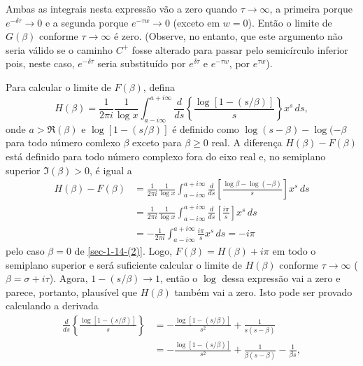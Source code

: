     Ambas as integrais nesta expressão vão a zero quando $\tau \to \infty$, a primeira porque $e^{-\delta \tau} \to 0$ e a segunda porque $e^{- \tau w} \to 0$ (exceto em $w = 0$). Então o limite de $G(\beta)$ conforme $\tau \to \infty$ é zero. (Observe, no entanto, que este argumento não seria válido se o caminho $C^{+}$ fosse alterado para passar pelo semicírculo inferior pois, neste caso, $e^{-\delta \tau}$ seria substituído por $e^{\delta \tau}$ e $e^{-\tau w}$, por $e^{\tau w}$).
    
    Para calcular o limite de $F(\beta)$, defina
    \begin{equation*}
        H(\beta) = \frac{1}{2 \pi i} \frac{1}{\log x} \int_{a - i\infty}^{a + i \infty} \frac{d}{ds} \left\{ \frac{\log [1 - (s/\beta)]}{s}\right\} x^s\, ds,
    \end{equation*}
    onde $a > \Re (\beta)$ e $\log [1 - (s/\beta)]$ é definido como $\log(s-\beta) - \log(-\beta$ para todo número comlexo $\beta$ exceto para $\beta \geq 0$ real. A diferença $H(\beta) - F(\beta)$ está definido para todo número complexo fora do eixo real e, no semiplano superior $\Im(\beta) > 0$, é igual a
    \begin{align*}
        H(\beta) - F(\beta) &= \frac{1}{2 \pi i} \frac{1}{\log x} \int_{a - i\infty}^{a + i \infty} \frac{d}{ds} \left[ \frac{\log \beta - \log (-\beta)}{s}\right] x^s\, ds \\
        &= \frac{1}{2 \pi i} \frac{1}{\log x} \int_{a - i\infty}^{a + i \infty} \frac{d}{ds} \left[ \frac{i\pi}{s}\right] x^s\, ds \\
        &= -\frac{1}{2 \pi i}  \int_{a - i\infty}^{a + i \infty} \frac{i\pi}{s} x^s\, ds = - i\pi
    \end{align*}
    pelo caso $\beta = 0$ de \eqref{sec-1-14-(2)}. Logo, $F(\beta) = H(\beta) + i\pi$ em todo o semiplano superior e será suficiente calcular o limite de $H(\beta)$ conforme $\tau \to \infty$ ($\beta = \sigma + i\tau$). Agora, $1 - (s/\beta) \to 1$, então o $\log$ dessa expressão vai a zero e parece, portanto, plausível que $H(\beta)$ também vai a zero. Isto pode ser provado calculando a derivada
    \begin{align*}
        \frac{d}{ds}\left\{ \frac{\log[1 - (s/\beta)]}{s} \right\} &= -\frac{\log[1 - (s/\beta)]}{s^2} + \frac{1}{s(s-\beta)} \\
        &= -\frac{\log[1 - (s/\beta)]}{s^2} + \frac{1}{\beta(s-\beta)} - \frac{1}{\beta s},
    \end{align*}
